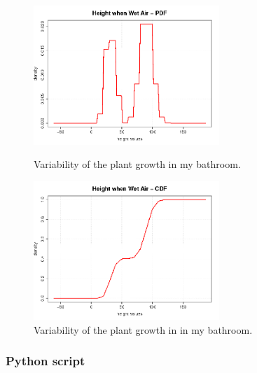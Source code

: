 \begin{figure}[H]
  \begin{minipage}{10cm}
    \begin{center}
      \includegraphics[width=7cm]{Height_PDF_WhenWet.png}
      \caption{Variability of the plant growth in my bathroom.}
      \label{PDFHeightWet}
    \end{center}
  \end{minipage}
  \hfill
  \begin{minipage}{10cm}
    \begin{center}
      \includegraphics[width=7cm]{Height_CDF_WhenWet.png}
      \caption{Variability of the plant growth in in my bathroom.}
      \label{CDFHeightWet}
    \end{center}
  \end{minipage}
\end{figure}






\subsubsection{Python script}


